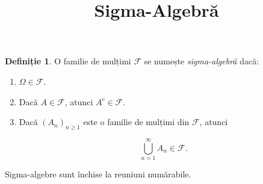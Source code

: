 \documentclass[12pt]{article}
\title{Sigma-Algebră}
\author{}
\date{}
\theoremstyle{definition}
\newtheorem{definition}{Definiție}
\begin{document}
\maketitle

\begin{definition}
O familie de mulțimi $\mathcal{F}$ se numește \emph{sigma-algebră} dacă:
\begin{enumerate}
    \item $\Omega \in \mathcal{F}$.
    \item Dacă $A \in \mathcal{F}$, atunci $A^{c} \in \mathcal{F}$.
    \item Dacă $(A_n)_{n \ge 1}$ este o familie de mulțimi din $\mathcal{F}$, atunci
    

\[
        \bigcup_{n=1}^{\infty} A_n \in \mathcal{F}.
    \]


\end{enumerate}
\end{definition}

\noindent
Sigma-algebre sunt închise la reuniuni numărabile.
\end{document}
